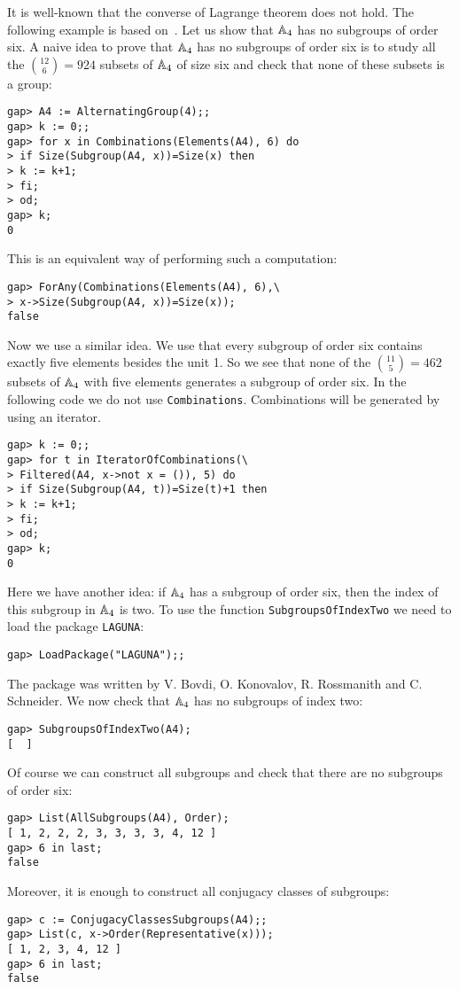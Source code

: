 \begin{example}
It is well-known that the converse of Lagrange theorem does not hold.  The
following example is based on~\cite{MR1573427}.  
Let us show that $\mathbb{A}_4$ has no subgroups of order six. 
A naive idea to prove that $\mathbb{A}_4$ has no subgroups of order six is to study
all the $\binom{12}{6}=924$ subsets of $\mathbb{A}_4$ of size six and check that none
of these subsets is a group: 
\begin{lstlisting}
gap> A4 := AlternatingGroup(4);;
gap> k := 0;;
gap> for x in Combinations(Elements(A4), 6) do
> if Size(Subgroup(A4, x))=Size(x) then
> k := k+1;
> fi;
> od;
gap> k;
0
\end{lstlisting}
This is an equivalent way of performing such a computation:
\begin{lstlisting}
gap> ForAny(Combinations(Elements(A4), 6),\
> x->Size(Subgroup(A4, x))=Size(x));
false
\end{lstlisting}

Now we use a similar idea. We use that every subgroup of order six contains
exactly five elements besides the unit 1.  So we see that none of the $\binom{11}{5}=462$
subsets of $\mathbb{A}_4$ with five elements generates a subgroup of order six.  In
the following code we do not use \lstinline{Combinations}. Combinations will be
generated by using an iterator.
\begin{lstlisting}
gap> k := 0;;
gap> for t in IteratorOfCombinations(\
> Filtered(A4, x->not x = ()), 5) do
> if Size(Subgroup(A4, t))=Size(t)+1 then
> k := k+1;
> fi;
> od;
gap> k;
0
\end{lstlisting}

Here we have another idea: if $\mathbb{A}_4$ has a subgroup of order six, then the
index of this subgroup in $\mathbb{A}_4$ is two. To use the
function 
\lstinline{SubgroupsOfIndexTwo}
we need to load the package
\lstinline{LAGUNA}:
\begin{lstlisting}
gap> LoadPackage("LAGUNA");;
\end{lstlisting}
The package was written by  
V. Bovdi,
   O. Konovalov,
   R. Rossmanith and
   C. Schneider. 
We now check that $\mathbb{A}_4$ has no subgroups of
index two:
\begin{lstlisting}
gap> SubgroupsOfIndexTwo(A4);
[  ]
\end{lstlisting}

Of course we can construct all subgroups and check that there are no subgroups
of order six: 
\begin{lstlisting}
gap> List(AllSubgroups(A4), Order);
[ 1, 2, 2, 2, 3, 3, 3, 3, 4, 12 ]
gap> 6 in last;
false
\end{lstlisting}
Moreover, it is enough to construct all conjugacy classes of subgroups:
\begin{lstlisting}
gap> c := ConjugacyClassesSubgroups(A4);;
gap> List(c, x->Order(Representative(x)));
[ 1, 2, 3, 4, 12 ]
gap> 6 in last;
false
\end{lstlisting}


\end{example}
